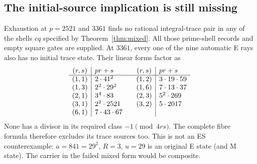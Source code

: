 \subsection{The initial-source implication is still missing}
Exhaustion at $p=2521$ and $3361$ finds no rational integral-trace pair in any
of the shells $cq$ specified by Theorem~\ref{thm:mixed}. All those prime-shell
records and empty square gates are supplied. At $3361$, every one of the nine
automatic E rays also has no initial trace state. Their linear forms factor as
\[
\begin{array}{c|l@{\qquad}c|l}
(r,s)&pr+s&(r,s)&pr+s\\\hline
(1,1)&2\cdot41^2&(1,2)&3\cdot19\cdot59\\
(1,3)&2^2\cdot29^2&(1,6)&7\cdot13\cdot37\\
(2,1)&3^4\cdot83&(2,3)&5^2\cdot269\\
(3,1)&2^2\cdot2521&(3,2)&5\cdot2017\\
(6,1)&7\cdot43\cdot67&&
\end{array}
\]
None has a divisor in its required class $-1\pmod{4rs}$. The complete fibre
formula therefore excludes its trace sources too. This is not an ES
counterexample: $a=841=29^2$, $R=3$, $u=29$ is an original E state (and M state).
The carrier in the failed mixed form would be composite.

